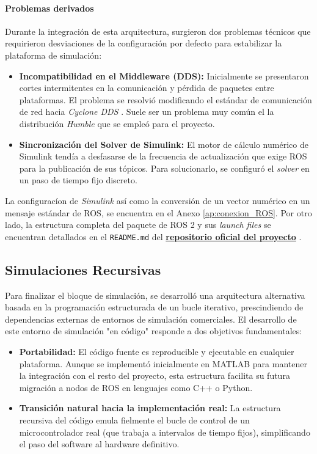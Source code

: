 \documentclass[11pt,fleqn]{book} %
\begin{document}
\paragraph{Problemas derivados}
Durante la integración de esta arquitectura, surgieron dos problemas técnicos que requirieron desviaciones de la configuración por defecto para estabilizar la plataforma de simulación:
\begin{itemize}
	\item \textbf{Incompatibilidad en el Middleware (DDS):} Inicialmente se presentaron cortes intermitentes en la comunicación y pérdida de paquetes entre plataformas. El problema se resolvió modificando el estándar de comunicación de red hacia \textit{Cyclone DDS} \cite{ros2_cyclone_dds}. Suele ser un problema muy común el la distribución \textit{Humble} que se empleó para el proyecto.
	
	\item \textbf{Sincronización del Solver de Simulink:} El motor de cálculo numérico de Simulink tendía a desfasarse de la frecuencia de actualización que exige ROS para la publicación de sus tópicos. Para solucionarlo, se configuró el \textit{solver} en un paso de tiempo fijo discreto.
\end{itemize}

La configuracíon de \textit{Simulink} así como la conversión de un vector numérico en un mensaje estándar de ROS, se encuentra en el Anexo \ref{ap:conexion_ROS}. Por otro lado, la estructura completa del paquete de ROS 2 y sus \textit{launch files} se encuentran detallados en el \texttt{README.md} del \href{https://github.com/MPV247/TFG_Control_MiguelPorcar}{\textbf{repositorio oficial del proyecto}} \cite{Porcar2026TFG}. 

\subsection{Simulaciones Recursivas}

Para finalizar el bloque de simulación, se desarrolló una arquitectura alternativa basada en la programación estructurada de un bucle iterativo, prescindiendo de dependencias externas de entornos de simulación comerciales. El desarrollo de este entorno de simulación "en código" responde a dos objetivos fundamentales:

\begin{itemize}[leftmargin=1cm, topsep=1mm, itemsep=0.5mm]
	\item \textbf{Portabilidad:} El código fuente es reproducible y ejecutable en cualquier plataforma. Aunque se implementó inicialmente en MATLAB para mantener la integración con el resto del proyecto, esta estructura facilita su futura migración a nodos de ROS en lenguajes como C++ o Python.
	\item \textbf{Transición natural hacia la implementación real:} La estructura recursiva del código emula fielmente el bucle de control de un microcontrolador real (que trabaja a intervalos de tiempo fijos), simplificando el paso del software al hardware definitivo.
\end{itemize}
\end{document}
